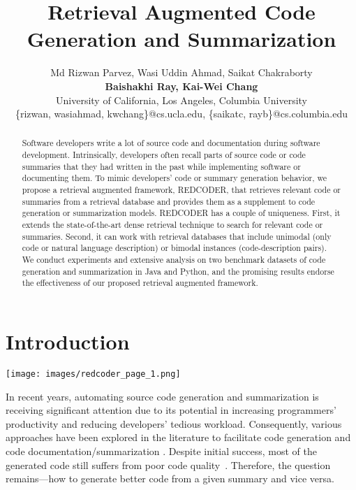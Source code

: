 \documentclass[11pt]{article}
\title{Retrieval Augmented Code Generation and Summarization}
\author{
Md Rizwan Parvez, Wasi Uddin Ahmad, Saikat Chakraborty \\
\textbf{Baishakhi Ray, Kai-Wei Chang} \\
University of California, Los Angeles, Columbia University \\
{\{rizwan, wasiahmad, kwchang\}@cs.ucla.edu}, {\{saikatc, rayb\}@cs.columbia.edu}
}
\newcommand{\tool}{{REDCODER}\xspace}
\begin{document}
\maketitle


\begin{abstract}







Software developers write a lot of source code and documentation during software development. Intrinsically, developers often recall parts of source code or code summaries that they had written in the past while implementing software or documenting them. To mimic developers' code or summary generation behavior, we propose a retrieval augmented framework, \tool, that retrieves relevant code or summaries from a retrieval database and provides them as a supplement to code generation or summarization models. \tool has a couple of uniqueness. First, it extends the state-of-the-art dense retrieval technique to search for relevant code or summaries. Second, it can work with retrieval databases that include unimodal (only code or natural language description) or bimodal instances (code-description pairs). We conduct experiments and extensive analysis on two benchmark datasets of code generation and summarization in Java and Python, and the promising results endorse the effectiveness of our proposed retrieval augmented framework.


\end{abstract}



\section{Introduction}
\label{sec:into}
\begin{figure*}
\captionsetup[subfigure]{labelformat=empty}
\centering
\texttt{[image: images/redcoder\_page\_1.png]}
\caption{Illustration of our proposed framework \tool for code generation. Given an input summary, we first retrieve top- candidate code (=1 in this example).  We then aggregate them and based on that a \emph{generator} module  generates the target sequence.  }
\vspace{-2mm}
\label{figure:workflow}
\end{figure*}


In recent years, automating source code generation and summarization is receiving significant attention due to its potential in increasing programmers’ productivity and reducing developers’ tedious workload.
Consequently, various approaches have been explored in the literature to facilitate code generation \cite{yin-neubig-2017-syntactic, gu2016deep} and code documentation/summarization \cite{ahmad-etal-2020-transformer, wei2019code, allamanis2018survey}.
Despite initial success, most of the generated code still suffers from poor code quality~\cite{xu2021ide}. 
Therefore, the question remains---how to generate better code from a given summary and vice versa. 
\end{document}
